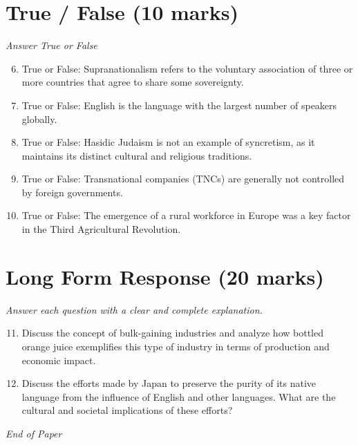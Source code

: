 \documentclass[12pt]{article}
\begin{document}
\section*{True / False (10 marks)}
\textit{Answer True or False}
\begin{enumerate}[label=\arabic*.]
\setcounter{enumi}{5}
\item True or False: Supranationalism refers to the voluntary association of three or more countries that agree to share some sovereignty.
\item True or False: English is the language with the largest number of speakers globally.
\item True or False: Hasidic Judaism is not an example of syncretism, as it maintains its distinct cultural and religious traditions.
\item True or False: Transnational companies (TNCs) are generally not controlled by foreign governments.
\item True or False: The emergence of a rural workforce in Europe was a key factor in the Third Agricultural Revolution.
\end{enumerate}

\section*{Long Form Response (20 marks)}
\textit{Answer each question with a clear and complete explanation.}
\begin{enumerate}[label=\arabic*.]
\setcounter{enumi}{10}
\item Discuss the concept of bulk-gaining industries and analyze how bottled orange juice exemplifies this type of industry in terms of production and economic impact.
\item Discuss the efforts made by Japan to preserve the purity of its native language from the influence of English and other languages. What are the cultural and societal implications of these efforts?
\end{enumerate}

\vfill
\noindent\textit{End of Paper}
\end{document}
